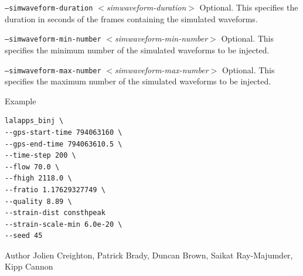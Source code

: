 \documentclass{article}
\newcommand{\option}[1]{\texttt{#1}}
\newcommand{\parm}[1]{$<$\textit{#1}$>$}
\newenvironment{entry}%
  {\begin{list}{}{\renewcommand{\makelabel}[1]%
    {\parbox[b]{\labelwidth}{\makebox[0pt][l]{\textbf{##1}}\\}}%
    \setlength{\labelwidth}{1em}%
    \setlength{\labelsep}{1em}%
    \setlength{\leftmargin}{2em}%
    \setlength{\topsep}{\medskipamount}%
    \setlength{\itemsep}{\medskipamount}%
    \setlength{\parsep}{\medskipamount}%
    \setlength{\listparindent}{0pt}}}
  {\end{list}}
\begin{document}
\begin{entry}
\begin{entry}
\item[\option{--simwaveform-duration} \parm{simwaveform-duration}]
Optional.  This specifies the duration in seconds of the frames containing the simulated 
waveforms.

\item[\option{--simwaveform-min-number} \parm{simwaveform-min-number}] 
Optional.  This specifies the minimum number of the simulated waveforms to be injected.

\item[\option{--simwaveform-max-number} \parm{simwaveform-max-number}] 
Optional.  This specifies the maximum number of the simulated waveforms to be injected.  
\end{entry}

\item[Example]
\begin{verbatim}
lalapps_binj \
--gps-start-time 794063160 \
--gps-end-time 794063610.5 \
--time-step 200 \
--flow 70.0 \
--fhigh 2118.0 \
--fratio 1.17629327749 \
--quality 8.89 \
--strain-dist consthpeak
--strain-scale-min 6.0e-20 \
--seed 45
\end{verbatim}

\item[Author] 
Jolien Creighton, Patrick Brady, Duncan Brown, Saikat Ray-Majumder, Kipp
Cannon
\end{entry}
\end{document}
